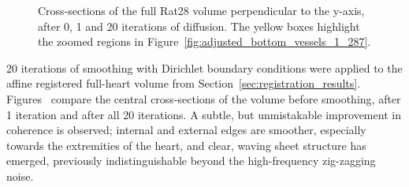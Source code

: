 \begin{figure}[htbp]
      \caption{Cross-sections of the full Rat28 volume perpendicular to the y-axis, after 0, 1 and 20 iterations of diffusion. The yellow boxes highlight the zoomed regions in Figure~\ref{fig:adjusted_bottom_vessels_1_287}.}
      \label{fig:adjusted_1_287}
    \end{figure}
    
    20 iterations of smoothing with Dirichlet boundary conditions were applied to the affine registered full-heart volume from Section~\ref{sec:registration_results}. Figures~ compare the central cross-sections of the volume before smoothing, after 1 iteration and after all 20 iterations. A subtle, but unmistakable improvement in coherence is observed; internal and external edges are smoother, especially towards the extremities of the heart, and clear, waving sheet structure has emerged, previously indistinguishable beyond the high-frequency zig-zagging noise.
    
